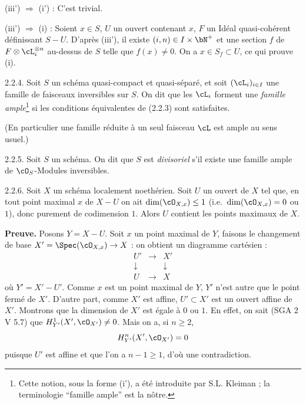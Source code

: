 (iii') $\Rightarrow$ (i') : C'est trivial.

(iii') $\Rightarrow$ (i) : Soient $x \in S$, $U$ un ouvert contenant $x$, $F$ un Id\'{e}al quasi-coh\'{e}rent d\'{e}finissant $S - U$. D'apr\`{e}s (iii'), il existe $(i,n) \in I \times \bN^+$ et une section $f$ de $F \otimes \cL_i^{\otimes n}$ au-dessus de $S$ telle que $f(x) \neq 0$. On a $x \in S_f \subset U$, ce qui prouve (i).

\begin{definition} 2.2.4.
Soit $S$ un sch\'{e}ma quasi-compact et quasi-s\'{e}par\'{e}, et soit $(\cL_i)_{i \in I}$ une famille de faisceaux inversibles sur $S$. On dit que les $\cL_i$ forment une \emph{famille ample}\footnote{Cette notion, sous la forme (i'), a \'{e}t\'{e} introduite par S.L. Kleiman ; la terminologie ``famille ample'' est la n\^{o}tre.} si les conditions \'{e}quivalentes de (2.2.3) sont satisfaites.
\end{definition}

(En particulier une famille r\'{e}duite \`{a} un seul faisceau $\cL$ est ample au sens usuel.)

\begin{lemme} 2.2.5.
Soit $S$ un sch\'{e}ma. On dit que $S$ est \emph{divisoriel} s'il existe une famille ample de $\cO_S$-Modules inversibles.
\end{lemme}

\begin{lemme} 2.2.6.
Soit $X$ un sch\'{e}ma localement noeth\'{e}rien. Soit $U$ un ouvert de $X$ tel que, en tout point maximal $x$ de $X - U$ on ait $\dim(\cO_{X,x}) \leq 1$ (i.e.~$\dim(\cO_{X,x}) = 0$ ou $1$), donc purement de codimension $1$. Alors $U$ contient les points maximaux de $X$.
\end{lemme}

\noindent\textbf{Preuve.} Posons $Y = X - U$. Soit $x$ un point maximal de $Y$, faisons le changement de base $X' = \Spec(\cO_{X,x}) \rightarrow X$ : on obtient un diagramme cart\'{e}sien :
\[
\begin{array}{ccc}
U' & \longrightarrow & X' \\
\downarrow & & \downarrow \\
U & \longrightarrow & X
\end{array}
\]
o\`{u} $Y' = X' - U'$. Comme $x$ est un point maximal de $Y$, $Y'$ n'est autre que le point ferm\'{e} de $X'$. D'autre part, comme $X'$ est affine, $U' \subset X'$ est un ouvert affine de $X'$. Montrons que la dimension de $X'$ est \'{e}gale \`{a} $0$ ou $1$. En effet, on sait (SGA 2 V 5.7) que $H^1_{Y'}(X', \cO_{X'}) \neq 0$. Mais on a, si $n \geq 2$,
\[
H^n_{Y'}(X', \cO_{X'}) = 0
\]
puisque $U'$ est affine et que l'on a $n-1 \geq 1$, d'o\`{u} une contradiction.

